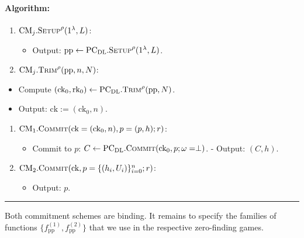 \documentclass[
]{article}
\providecommand{\tightlist}{%
  \setlength{\itemsep}{0pt}\setlength{\parskip}{0pt}}
\newcommand*{\Setup}{\mathrm{\text{S{\scriptsize ETUP}}}}
\newcommand*{\Trim}{\mathrm{\text{T{\scriptsize RIM}}}}
\newcommand*{\Commit}{\mathrm{\text{C{\scriptsize OMMIT}}}}
\newcommand*{\PCDL}{\text{PC}_{\text{DL}}}
\newcommand*{\PCDLSetup}{\PCDL.\Setup}
\newcommand*{\PCDLTrim}{\PCDL.\Trim}
\newcommand*{\PCDLCommit}{\PCDL.\Commit}
\newcommand*{\CM}{\mathrm{\text{CM}}}
\begin{document}
\paragraph{Algorithm:}\label{algorithm}

\begin{enumerate}
\def\labelenumi{\arabic{enumi}.}
\tightlist
\item
  \(\CM_j.\Setup^{\rho}(1^\lambda, L)\):

  \begin{itemize}
  \tightlist
  \item
    Output: \(\text{pp} \leftarrow \PCDLSetup^\rho(1^\lambda, L)\).
  \end{itemize}
\item
  \(\CM_j.\Trim^\rho(\text{pp}, n, N)\):
\end{enumerate}

\begin{itemize}
\tightlist
\item
  Compute
  \((\text{ck}_0, \text{rk}_0) \leftarrow \PCDLTrim^\rho(\text{pp}, N)\).
\item
  Output: \(\text{ck} := (\text{ck}_0, n)\).
\end{itemize}

\begin{enumerate}
\def\labelenumi{\arabic{enumi}.}
\setcounter{enumi}{2}
\tightlist
\item
  \(\CM_1.\Commit(\text{ck} = (\text{ck}_0, n), p = (p, h); r)\):

  \begin{itemize}
  \tightlist
  \item
    Commit to \(p\): \(C \leftarrow \PCDLCommit(\text{ck}_0,
    p; \omega = \perp)\). - Output: \((C, h)\).
  \end{itemize}
\item
  \(\CM_2.\Commit(\text{ck}, p = \{(h_i, U_i)\}_{i=0}^n; r)\):

  \begin{itemize}
  \tightlist
  \item
    Output: \(p\).
  \end{itemize}
\end{enumerate}

\begin{center}\rule{0.5\linewidth}{0.5pt}\end{center}

Both commitment schemes are binding. It remains to specify the families
of functions \(\{f^{(1)}_{\text{pp}}, f^{(2)}_{\text{pp}}\}\) that we
use in the respective zero-finding games.
\end{document}
